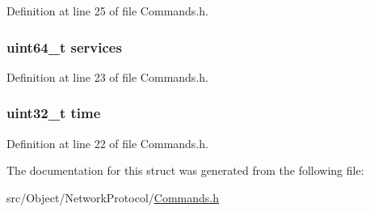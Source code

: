 Definition at line 25 of file Commands.h.

\hypertarget{struct_network_address_a8361260b2ca75771b8da0333191db456}{
\subsubsection[{services}]{\setlength{\rightskip}{0pt plus 5cm}uint64\_\-t {\bf services}}}
\label{struct_network_address_a8361260b2ca75771b8da0333191db456}


Definition at line 23 of file Commands.h.

\hypertarget{struct_network_address_ae73654f333e4363463ad8c594eca1905}{
\subsubsection[{time}]{\setlength{\rightskip}{0pt plus 5cm}uint32\_\-t {\bf time}}}
\label{struct_network_address_ae73654f333e4363463ad8c594eca1905}


Definition at line 22 of file Commands.h.



The documentation for this struct was generated from the following file:\begin{DoxyCompactItemize}
\item 
src/Object/NetworkProtocol/\hyperlink{_commands_8h}{Commands.h}\end{DoxyCompactItemize}
